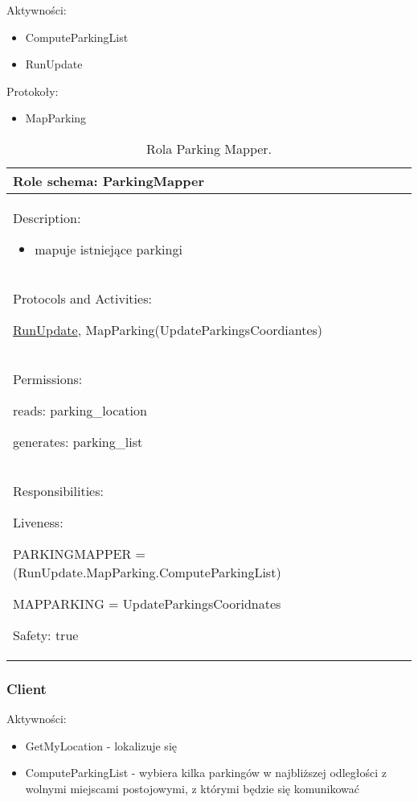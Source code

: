 Aktywności:
\begin{itemize}
    \item ComputeParkingList
    \item RunUpdate

\end{itemize}

Protokoły:
\begin{itemize}
    \item MapParking
\end{itemize}


\begin{table}[!h] \label{tab:rola1} \centering
    \caption{Rola Parking Mapper.}
    \begin{tabular} {| p{14cm} |} \hline
        Role schema: ParkingMapper \\ \hline
        Description:

        \begin{itemize}
            \item mapuje istniejące parkingi
        \end{itemize} \\ \hline
        Protocols and Activities: 
        
        \ul{RunUpdate}, MapParking(UpdateParkingsCoordiantes) \\ \hline
        Permissions:

        reads: parking\_location

        generates:  parking\_list                                                                                 \\ \hline
        Responsibilities:

        Liveness: 
        
        PARKINGMAPPER = (RunUpdate.MapParking.ComputeParkingList)

        MAPPARKING = UpdateParkingsCooridnates 
        

        Safety: true                                                                                                                \\ \hline
    \end{tabular}
\end{table}

\newpage
\subsubsection{Client}

Aktywności:
\begin{itemize}
    \item GetMyLocation - lokalizuje się
    \item ComputeParkingList - wybiera kilka parkingów w najbliższej odległości z wolnymi miejscami postojowymi, z którymi będzie się komunikować

\end{itemize}

